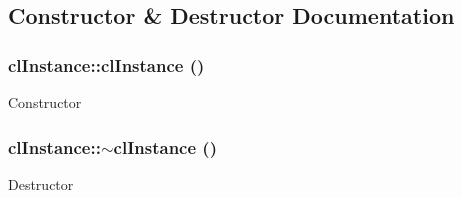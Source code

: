 \subsection{Constructor \& Destructor Documentation}
\hypertarget{classcl_instance_a0f7c36b88b2fc0cc5d44447cc76c43a3}{
\subsubsection[{clInstance}]{\setlength{\rightskip}{0pt plus 5cm}clInstance::clInstance ()}}
\label{classcl_instance_a0f7c36b88b2fc0cc5d44447cc76c43a3}
Constructor \hypertarget{classcl_instance_aaef41aa3d1383c182de828eea83c2b4f}{
\subsubsection[{$\sim$clInstance}]{\setlength{\rightskip}{0pt plus 5cm}clInstance::$\sim$clInstance ()}}
\label{classcl_instance_aaef41aa3d1383c182de828eea83c2b4f}
Destructor 

